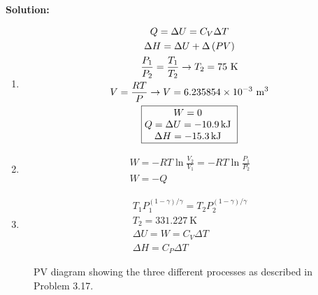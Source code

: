 \documentclass{article}
\newcommand*\widefbox[1]{\fbox{\vspace{0.5em}\hspace{2em}#1\hspace{2em}\vspace{0.5em}}}
\newenvironment{solution}{\par\noindent\textbf{\\Solution:\\}}{\par\medskip}
\begin{document}
\begin{solution}
  \begin{enumerate}[label=(\alph*)]
    \item
      \begin{gather*}
        Q=\Delta U=C_{V}\Delta T\\
        \Delta H=\Delta U+\Delta \left( PV \right)\\
        \frac{P_{1}}{P_{2}}=\frac{T_{1}}{T_{2}}  \to  T_{2}=75~\unit{
        \kelvin }\\
        V = \frac{RT}{P}  \to  V =
        6.235854\times10^{-3}~\unit{ \meter\cubed }\\
        \fbox{%
          \parbox{\widthof{$Q = \Delta U =
          \SI{-10.9}{\kilo\joule}$}}{%
            \centering
            $W = 0$ \\
            $Q = \Delta U = \SI{-10.9}{\kilo\joule}$ \\
            $\Delta H = \SI{-15.3}{\kilo\joule}$
          }
        }
      \end{gather*}
    \item
      \begin{gather*}
        W=-RT\ln\frac{V_{2}}{V_{1}}=-RT\ln\frac{P_{1}}{P_{2}} \\
        W=-Q
      \end{gather*}
    \item
      \begin{gather*}
        T_{1}P_{1}^{\left( 1-\gamma
        \right)/\gamma}=T_{2}P_{2}^{\left( 1-\gamma  \right)/\gamma }\\
        T_{2}=331.227~\unit{ \kelvin }\\
        \Delta U=W=C_{V}\Delta T\\
        \Delta H=C_{P}\Delta T
      \end{gather*}
  \end{enumerate}
  \begin{figure}[h!]
    \centering
    \scalebox{0.5}{}
    \caption{PV diagram showing the three different processes as
    described in Problem 3.17.}
    \label{fig:s17}
  \end{figure}
\end{solution}
\end{document}
